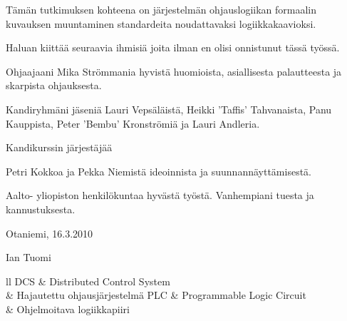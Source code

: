 \documentclass[finnish,12pt]{article}
\begin{document}
	
	


	\author{Ian Tuomi}
	\date{5.12.2012}
	\makecoverpage

	\begin{abstractpage}[finnish]
  
Tämän tutkimuksen kohteena on järjestelmän ohjauslogiikan formaalin kuvauksen muuntaminen standardeita noudattavaksi logiikkakaavioksi.
  
	\end{abstractpage}

	\newpage
	\vspace{10cm}

Haluan kiittää seuraavia ihmisiä joita ilman en olisi onnistunut tässä työssä.

Ohjaajaani Mika Strömmania hyvistä huomioista,  asiallisesta palautteesta ja skarpista ohjauksesta.

Kandiryhmäni jäseniä Lauri Vepsäläistä, Heikki 'Taffis' Tahvanaista, Panu Kauppista, Peter 'Bembu'  Kronströmiä ja Lauri Andleria.

Kandikurssin järjestäjää 

Petri Kokkoa ja Pekka Niemistä ideoinnista ja suunnannäyttämisestä.

Aalto- yliopiston henkilökuntaa hyvästä työstä.
Vanhempiani tuesta ja kannustuksesta.
\\

	\vspace{5cm}

Otaniemi, 16.3.2010

	\vspace{5mm}
	{\hfill Ian Tuomi \hspace{1cm}}

	\newpage


	\tableofcontents



	\begin{tabular}{ll}
DCS        & Distributed Control System \\
	      & Hajautettu ohjausjärjestelmä
PLC      & Programmable Logic Circuit \\
	      & Ohjelmoitava logiikkapiiri
	\end{tabular}
\end{document}
